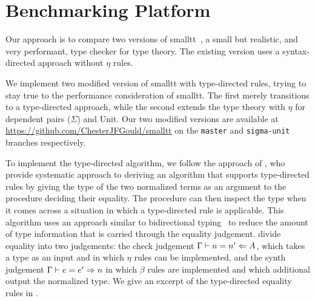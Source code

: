 \section{Benchmarking Platform}
Our approach is to compare two versions of smalltt~\cite{smalltt}, a small but realistic, and very performant, type checker for type theory.
The existing version uses a syntax-directed approach without $\eta$ rules.

We implement two modified version of smalltt with type-directed rules, trying to stay true to the performance consideration of smalltt.
The first merely transitions to a type-directed approach, while the second extends the type theory with $\eta$ for dependent pairs ($\Sigma$) and Unit.
Our two modified versions are available at \url{https://github.com/ChesterJFGould/smalltt} on the \texttt{master} and \texttt{sigma-unit} branches respectively.

To implement the type-directed algorithm, we follow the approach of \citet{Chapman2005}, who provide systematic approach to deriving an algorithm that supports type-directed rules by giving the type of the two normalized terms as an argument to the procedure deciding their equality.
The procedure can then inspect the type when it comes across a situation in which a type-directed rule is applicable.
This algorithm uses an approach similar to bidirectional typing~\cite{Dunfield2021} to reduce the amount of type information that is carried through the equality judgement.
\citet{Chapman2005} divide equality into two judgements: the check judgement $\Gamma \vdash n = n' \Leftarrow A$, which takes a type as an input and in which $\eta$ rules can be implemented, and the synth judgement $\Gamma \vdash e = e' \Rightarrow n$ in which $\beta$ rules are implemented and which additional output the normalized type.
We give an excerpt of the type-directed equality rules in .

% 

